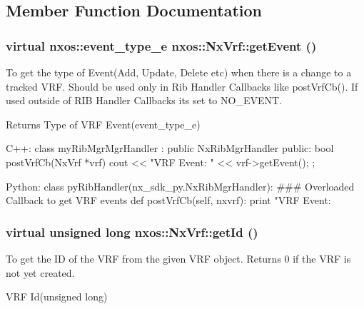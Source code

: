 \subsection{Member Function Documentation}
\hypertarget{classnxos_1_1NxVrf_a42bdba27e42981d74066a72c24809c98}{
\subsubsection[{getEvent}]{\setlength{\rightskip}{0pt plus 5cm}virtual nxos::event\_\-type\_\-e nxos::NxVrf::getEvent ()}}
\label{classnxos_1_1NxVrf_a42bdba27e42981d74066a72c24809c98}
To get the type of Event(Add, Update, Delete etc) when there is a change to a tracked VRF. Should be used only in Rib Handler Callbacks like postVrfCb(). If used outside of RIB Handler Callbacks its set to NO\_\-EVENT.

\begin{DoxyReturn}{Returns}
Type of VRF Event(event\_\-type\_\-e)
\end{DoxyReturn}

\begin{DoxyCode}
  C++:
     class myRibMgrMgrHandler : public NxRibMgrHandler {
        public:
           bool postVrfCb(NxVrf *vrf) {
                cout << "VRF Event: " << vrf->getEvent();
           }
     };

  Python:
     class pyRibHandler(nx_sdk_py.NxRibMgrHandler):
     ### Overloaded Callback to get VRF events
           def postVrfCb(self, nxvrf):
               print "VRF Event: %
\end{DoxyCode}
 \hypertarget{classnxos_1_1NxVrf_a4ab30d5ff7a1d5d2abbab21652cd59fa}{
\subsubsection[{getId}]{\setlength{\rightskip}{0pt plus 5cm}virtual unsigned long nxos::NxVrf::getId ()}}
\label{classnxos_1_1NxVrf_a4ab30d5ff7a1d5d2abbab21652cd59fa}
To get the ID of the VRF from the given VRF object. Returns 0 if the VRF is not yet created.

VRF Id(unsigned long)


